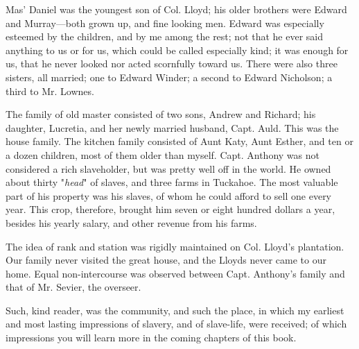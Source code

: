 Mas' Daniel was the youngest son of Col. Lloyd; his older brothers were
Edward and Murray---both grown up, and fine looking men. Edward was
especially esteemed by the children, and by me among the rest; not that
he ever said anything to us or for us, which could be called especially
kind; {\protect\hypertarget{78}{}{}}it was enough for us, that he never
looked nor acted scornfully toward us. There were also three sisters,
all married; one to Edward Winder; a second to Edward Nicholson; a third
to Mr. Lownes.

The family of old master consisted of two sons, Andrew and Richard; his
daughter, Lucretia, and her newly married husband, Capt. Auld. This was
the house family. The kitchen family consisted of Aunt Katy, Aunt
Esther, and ten or a dozen children, most of them older than myself.
Capt. Anthony was not considered a rich slaveholder, but was pretty well
off in the world. He owned about thirty "\emph{head}" of slaves, and
three farms in Tuckahoe. The most valuable part of his property was his
slaves, of whom he could afford to sell one every year. This crop,
therefore, brought him seven or eight hundred dollars a year, besides
his yearly salary, and other revenue from his farms.

The idea of rank and station was rigidly maintained on Col. Lloyd's
plantation. Our family never visited the great house, and the Lloyds
never came to our home. Equal non-intercourse was observed between Capt.
Anthony's family and that of Mr. Sevier, the overseer.

Such, kind reader, was the community, and such the place, in which my
earliest and most lasting impressions of slavery, and of slave-life,
were received; of which impressions you will learn more in the coming
chapters of this book.
